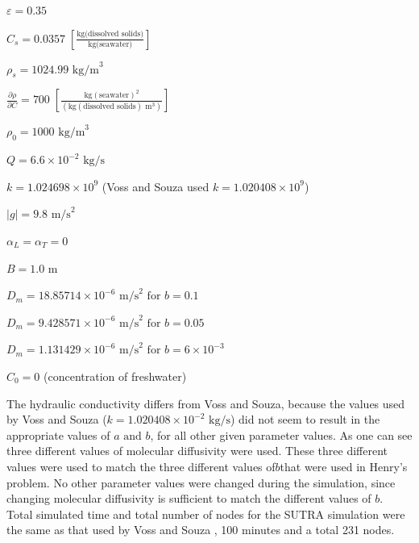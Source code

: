 \documentclass{article}
\newcommand{\pderiv}[2]{\frac{\partial #1}{\partial #2}} %
\newcommand{\spbox}[1]{ \text{ #1 }} %
\begin{document}
$\varepsilon =0.35$

$C_{s} =0.0357 \; \left[\frac{ \text{kg(dissolved solids)} }{
\text{kg(seawater)} } \right]$

$\rho _{s} =1024.99 \text{ kg/m} ^{3} $ 

$\pderiv{\rho}{C} = 700 \; \left[\frac{ \text{kg} \left( \text{seawater}
\right)^{2} }{\left( \text{kg} \left( \text{dissolved solids} \right) \text{ m}
^{3} \right)} \right]$

$\rho _{0} =1000 \text{ kg/m} ^{3} $ 

$Q=6.6\times 10^{-2} \text{ kg/s} $

$k= 1.024698 \times 10^{9} $ (Voss and Souza used $k= 1.020408 \times 10^{9} $)

$\left|g\right| = 9.8 \text{ m/s} ^{2} $

$\alpha _{L} = \alpha _{T} =0 $ 

$B=1.0 \text{ m} $ 

$D_{m} =18.85714\times 10^{-6} \text{ m/s} ^{2} \spbox{for} b = 0.1$

$D_{m} = 9.428571 \times 10^{-6} \text{ m/s} ^{2} \spbox{for} b=0.05$

$D_{m} = 1.131429 \times 10^{-6} \text{ m/s} ^{2} \spbox{for} b = 6\times 10^{-3} $

$C_{0} =0$ (concentration of freshwater)

The hydraulic conductivity differs from Voss and Souza, because the values used
by Voss and Souza ($k=1.020408 \times 10^{-2} \text{ kg/s} $) did not seem to
result in the appropriate values of $a \spbox{and} b$, for all other given parameter
values. As one can see three different values of molecular diffusivity were
used. These three different values were used to match the three different values
of$b$that were used in Henry's problem. No other parameter values were changed
during the simulation, since changing molecular diffusivity is sufficient to
match the different values of $b$. Total simulated time and total number of
nodes for the SUTRA simulation were the same as that used by Voss and Souza
\cite{Voss}, 100 minutes and a total 231 nodes.
\end{document}
